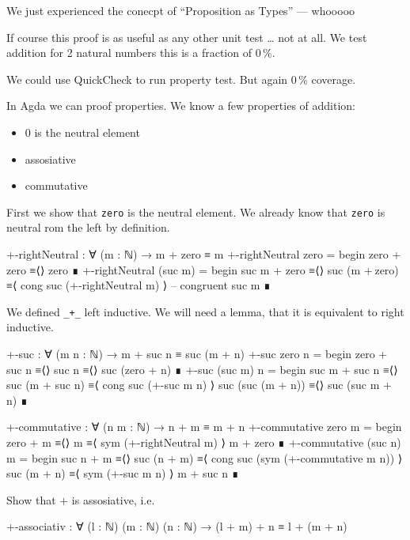 We just experienced the conecpt of “Proposition as Types” — whooooo

If course this proof is as useful as any other unit test … not at all.
We test addition for 2 natural numbers this is a fraction of 0\,\%.

We could use QuickCheck to run property test. But again 0\,\% coverage.

In Agda we can proof properties. We know a few properties of addition:
\begin{itemize}
  \item $0$ is the neutral element
  \item assosiative
  \item commutative
\end{itemize}

First we show that \verb+zero+ is the neutral element. We already
know that \verb+zero+ is neutral rom the left by definition.
\begin{code}
+-rightNeutral : ∀ (m : ℕ) → m + zero ≡ m
+-rightNeutral zero =
  begin
    zero + zero
  ≡⟨⟩
    zero
  ∎
+-rightNeutral (suc m) =
  begin
    suc m + zero
  ≡⟨⟩
    suc (m + zero)
  ≡⟨ cong  suc (+-rightNeutral m) ⟩ -- congruent
    suc m
  ∎
\end{code}

We defined \verb=_+_= left inductive. We will need a lemma, that
it is equivalent to right inductive.
\begin{code}
+-suc : ∀ (m n : ℕ) → m + suc n ≡ suc (m + n)
+-suc zero n =
  begin
    zero + suc n
  ≡⟨⟩
    suc n
  ≡⟨⟩
    suc (zero + n)
  ∎
+-suc (suc m) n =
  begin
    suc m + suc n
  ≡⟨⟩
    suc (m + suc n)
  ≡⟨ cong suc (+-suc m n) ⟩
    suc (suc (m + n))
  ≡⟨⟩
    suc (suc m + n)
  ∎
\end{code}

\begin{code}
+-commutative : ∀ (n m : ℕ) → n + m ≡ m + n
+-commutative zero m =
  begin
    zero + m
  ≡⟨⟩
    m
  ≡⟨ sym (+-rightNeutral m) ⟩
    m + zero
  ∎
+-commutative (suc n) m =
  begin
    suc n + m
  ≡⟨⟩
    suc (n + m)
  ≡⟨ cong suc (sym (+-commutative m n)) ⟩
    suc (m + n)
  ≡⟨ sym (+-suc m n) ⟩
    m + suc n
  ∎
\end{code}

\begin{exercise}
Show that $+$ is assosiative, i.e.

\begin{code}
+-associativ : ∀ (l : ℕ) (m : ℕ) (n : ℕ)
  → (l + m) + n ≡ l + (m + n)
\end{code}
\end{exercise}

